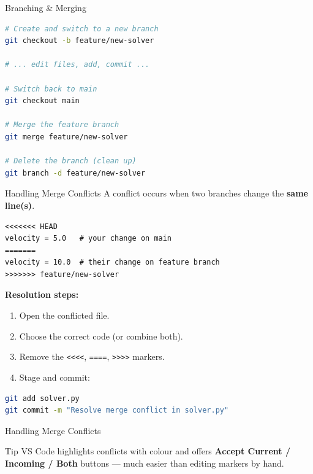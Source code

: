 \documentclass[aspectratio=169, 11pt]{beamer}
\begin{document}
\begin{frame}[fragile]{Branching \& Merging}
  \begin{lstlisting}[language=bash]
# Create and switch to a new branch
git checkout -b feature/new-solver

# ... edit files, add, commit ...

# Switch back to main
git checkout main

# Merge the feature branch
git merge feature/new-solver

# Delete the branch (clean up)
git branch -d feature/new-solver
  \end{lstlisting}

  \vspace{0.3em}
\end{frame}

\begin{frame}[fragile]{Handling Merge Conflicts}
  A conflict occurs when two branches change the \textbf{same line(s)}.

  \begin{lstlisting}
<<<<<<< HEAD
velocity = 5.0   # your change on main
=======
velocity = 10.0  # their change on feature branch
>>>>>>> feature/new-solver
  \end{lstlisting}

  \textbf{Resolution steps:}
  \begin{enumerate}
    \item Open the conflicted file.
    \item Choose the correct code (or combine both).
    \item Remove the \texttt{<{}<{}<{}<{}}, \texttt{={}={}={}={}}, \texttt{>{}>{}>{}>{}} markers.
    \item Stage and commit:
  \end{enumerate}

  \begin{lstlisting}[language=bash]
git add solver.py
git commit -m "Resolve merge conflict in solver.py"
  \end{lstlisting}
\end{frame}

\begin{frame}[fragile]{Handling Merge Conflicts}
  \begin{block}{Tip}
    VS Code highlights conflicts with colour and offers \textbf{Accept Current / Incoming / Both} buttons --- much easier than editing markers by hand.
  \end{block}
\end{frame}
\end{document}
